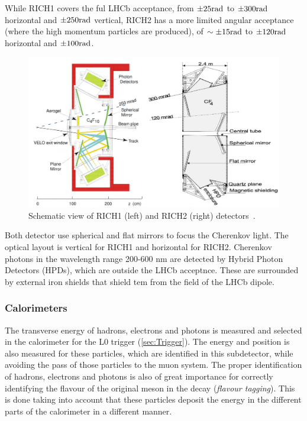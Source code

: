 While RICH1 covers the ful LHCb acceptance, from $\pm 25 \rm rad$ to $\pm 300 \rm rad$ horizontal and $\pm 250 \rm rad$ vertical, RICH2 has a more limited angular acceptance (where the high momentum particles are produced), of $\sim \pm 15 \rm rad$ to $\pm 120 \rm rad$ horizontal and $\pm 100 \rm rad$.

\begin{figure} [htb!]
\begin{center}
\includegraphics[scale=1.5]{figs/RICH.png}
\caption{Schematic view of  RICH1 (left) and RICH2 (right) detectors~\cite{Alves:2008zz}.\label{fig:lhcb_rich}}
\end{center}
\end{figure}

Both detector use spherical and flat mirrors to focus the Cherenkov light. The optical layout is vertical for RICH1 and horizontal for RICH2. Cherenkov photons in the wavelength range 200-600 nm are detected by Hybrid Photon Detectors (HPDs), which are outside the LHCb acceptnce. These are surrounded by external iron shields that shield tem from the  field of the LHCb dipole. 

\subsubsection{Calorimeters} %
The transverse energy of hadrons, electrons and photons is measured and selected in the calorimeter for the L0 trigger (\ref{sec:Trigger}). The energy and position is also measured for these particles, which are identified in this subdetector, while avoiding the pass of those particles to the muon system. The proper identification of hadrons, electrons and photons is also of great importance for correctly identifying the flavour of the original meson in the decay (\textit{flavour tagging}). This is done taking into account that these particles deposit the energy in the different parts of the calorimeter in a different manner. 
 
